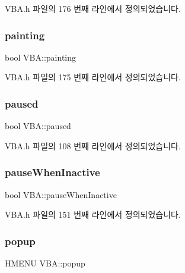 V\+B\+A.\+h 파일의 176 번째 라인에서 정의되었습니다.

\mbox{\label{class_v_b_a_acf5db3724f3961d0c7b7a48b1682ab09}} 
\subsubsection{\texorpdfstring{painting}{painting}}
{\footnotesize\ttfamily bool V\+B\+A\+::painting}



V\+B\+A.\+h 파일의 175 번째 라인에서 정의되었습니다.

\mbox{\label{class_v_b_a_af7447bf3bf3f93948d2757e4cb223cfc}} 
\subsubsection{\texorpdfstring{paused}{paused}}
{\footnotesize\ttfamily bool V\+B\+A\+::paused}



V\+B\+A.\+h 파일의 108 번째 라인에서 정의되었습니다.

\mbox{\label{class_v_b_a_a77e9763291376839d4c1e5eff00604b5}} 
\subsubsection{\texorpdfstring{pause\+When\+Inactive}{pauseWhenInactive}}
{\footnotesize\ttfamily bool V\+B\+A\+::pause\+When\+Inactive}



V\+B\+A.\+h 파일의 151 번째 라인에서 정의되었습니다.

\mbox{\label{class_v_b_a_ae9de0b5d432ad2e8a21faf040182fe03}} 
\subsubsection{\texorpdfstring{popup}{popup}}
{\footnotesize\ttfamily H\+M\+E\+NU V\+B\+A\+::popup}



